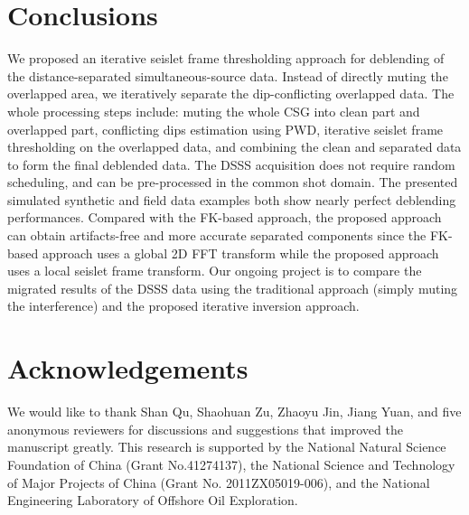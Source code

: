 \section{Conclusions}
We proposed an iterative seislet frame thresholding approach for deblending of the distance-separated simultaneous-source data. Instead of directly muting the overlapped area, we iteratively separate the dip-conflicting overlapped data. The whole processing steps include: muting the whole CSG into clean part and overlapped part, conflicting dips estimation using PWD, iterative seislet frame thresholding on the overlapped data, and combining the clean and separated data to form the final deblended data. The DSSS acquisition does not require random scheduling, and can be pre-processed in the common shot domain. The presented simulated synthetic and field data examples both show nearly perfect deblending performances. Compared with the FK-based approach, the proposed approach can obtain artifacts-free and more accurate separated components since the FK-based approach uses a global 2D FFT transform while the proposed approach uses a local seislet frame transform. Our ongoing project is to compare the migrated results of the DSSS data using the traditional approach (simply muting the interference) and the proposed iterative inversion approach.

\section{Acknowledgements}
We would like to thank Shan Qu, Shaohuan Zu, Zhaoyu Jin, Jiang Yuan, and five anonymous reviewers for discussions and suggestions that improved the manuscript greatly. This research is supported by the National Natural Science Foundation of China (Grant No.41274137), the National Science and Technology of Major Projects of China (Grant No. 2011ZX05019-006), and the National Engineering Laboratory of Offshore Oil Exploration.




















